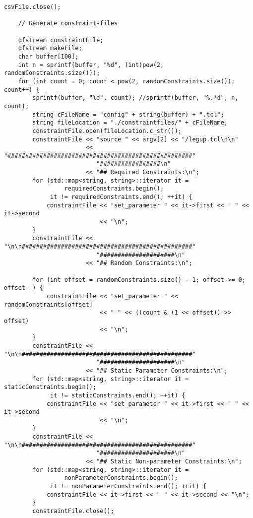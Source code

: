 \begin{lstlisting}[caption={Constraint-generation program source code},label=lst:constraintGenerating]
    csvFile.close();

    // Generate constraint-files

    ofstream constraintFile;
    ofstream makeFile;
    char buffer[100];
    int n = sprintf(buffer, "%d", (int)pow(2, randomConstraints.size()));
    for (int count = 0; count < pow(2, randomConstraints.size()); count++) {
        sprintf(buffer, "%d", count); //sprintf(buffer, "%.*d", n, count);
        string cFileName = "config" + string(buffer) + ".tcl";
        string fileLocation = "./constraintfiles/" + cFileName;
        constraintFile.open(fileLocation.c_str());
        constraintFile << "source " << argv[2] << "/legup.tcl\n\n"
                       << "####################################################"
                          "#################\n"
                       << "## Required Constraints:\n";
        for (std::map<string, string>::iterator it =
                 requiredConstraints.begin();
             it != requiredConstraints.end(); ++it) {
            constraintFile << "set_parameter " << it->first << " " << it->second
                           << "\n";
        }
        constraintFile << "\n\n################################################"
                          "#####################\n"
                       << "## Random Constraints:\n";

        for (int offset = randomConstraints.size() - 1; offset >= 0; offset--) {
            constraintFile << "set_parameter " << randomConstraints[offset]
                           << " " << ((count & (1 << offset)) >> offset)
                           << "\n";
        }
        constraintFile << "\n\n################################################"
                          "#####################\n"
                       << "## Static Parameter Constraints:\n";
        for (std::map<string, string>::iterator it = staticConstraints.begin();
             it != staticConstraints.end(); ++it) {
            constraintFile << "set_parameter " << it->first << " " << it->second
                           << "\n";
        }
        constraintFile << "\n\n################################################"
                          "#####################\n"
                       << "## Static Non-parameter Constraints:\n";
        for (std::map<string, string>::iterator it =
                 nonParameterConstraints.begin();
             it != nonParameterConstraints.end(); ++it) {
            constraintFile << it->first << " " << it->second << "\n";
        }
        constraintFile.close();


\end{lstlisting}
